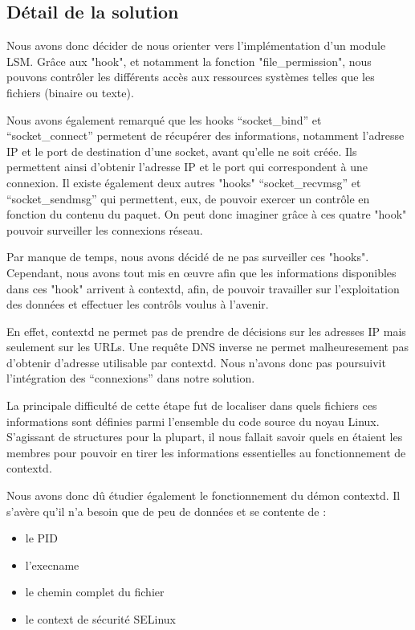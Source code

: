\documentclass[pdftex,a4paper,titlepage,11pt]{article}
\begin{document}
\subsection{Détail de la solution}

Nous avons donc décider de nous orienter vers l'implémentation d'un module LSM. Grâce aux "hook", et notamment la fonction "file\_permission", nous pouvons contrôler les différents accès aux ressources systèmes telles que les fichiers (binaire ou texte).

Nous avons également remarqué que les hooks ``socket\_bind'' et ``socket\_connect'' permetent de récupérer des informations, notamment l'adresse IP et le port de destination d'une socket, avant qu'elle ne soit créée. Ils permettent ainsi d'obtenir l'adresse IP et le port qui correspondent à une connexion. Il existe également deux autres "hooks" ``socket\_recvmsg'' et ``socket\_sendmsg'' qui permettent, eux, de pouvoir exercer un contrôle en fonction du contenu du paquet. On peut donc imaginer grâce à ces quatre "hook" pouvoir surveiller les connexions réseau.

Par manque de temps, nous avons décidé de ne pas surveiller ces "hooks". Cependant, nous avons tout mis en œuvre afin que les informations disponibles dans ces "hook" arrivent à contextd, afin, de pouvoir travailler sur l'exploitation des données et effectuer les contrôls voulus à l'avenir.

En effet, contextd ne permet pas de prendre de décisions sur les adresses IP mais seulement sur les URLs. Une requête DNS inverse ne permet malheuresement pas d'obtenir d'adresse utilisable par contextd. Nous n'avons donc pas poursuivit l'intégration des ``connexions'' dans notre solution.

La principale difficulté de cette étape fut de localiser dans quels fichiers ces informations sont définies parmi l'ensemble du code source du noyau Linux. S'agissant de structures pour la plupart, il nous fallait savoir quels en étaient les membres pour pouvoir en tirer les informations essentielles au fonctionnement de contextd.

Nous avons donc dû étudier également le fonctionnement du démon contextd. Il s'avère qu'il n'a besoin que de peu de données et se contente de :
	\begin{itemize}
		\item le PID
		\item l'execname
		\item le chemin complet du fichier
		\item le context de sécurité SELinux~\\
	\end{itemize}
	
\end{document}
